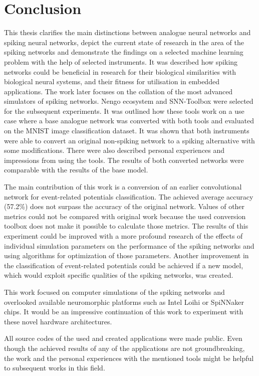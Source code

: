 \chapter{Conclusion} \label{chap:07}

This thesis clarifies the main distinctions between analogue neural networks and spiking neural networks, depict the current state of research in the area of the spiking networks and demonstrate the findings on a selected machine learning problem with the help of selected instruments. It was described how spiking networks could be beneficial in research for their biological similarities with biological neural systems, and their fitness for utilisation in embedded applications. The work later focuses on the collation of the most advanced simulators of spiking networks. Nengo ecosystem and SNN-Toolbox were selected for the subsequent experiments. It was outlined how these tools work on a use case where a base analogue network was converted with both tools and evaluated on the MNIST image classification dataset. It was shown that both instruments were able to convert an original non-spiking network to a spiking alternative with some modifications. There were also described personal experiences and impressions from using the tools. The results of both converted networks were comparable with the results of the base model. \par
The main contribution of this work is a conversion of an earlier convolutional network for event-related potentials classification. The achieved average accuracy (57.2\%) does not surpass the accuracy of the original network. Values of other metrics could not be compared with original work because the used conversion toolbox does not make it possible to calculate those metrics. The results of this experiment could be improved with a more profound research of the effects of individual simulation parameters on the performance of the spiking networks and using algorithms for optimization of those parameters. Another improvement in the classification of event-related potentials could be achieved if a new model, which would exploit specific qualities of the spiking networks, was created. \par
This work focused on computer simulations of the spiking networks and overlooked available neuromorphic platforms such as Intel Loihi or SpiNNaker chips. It would be an impressive continuation of this work to experiment with these novel hardware architectures. \par
All source codes of the used and created applications were made public\footnotemark. Even though the achieved results of any of the applications are not groundbreaking, the work and the personal experiences with the mentioned tools might be helpful to subsequent works in this field.
